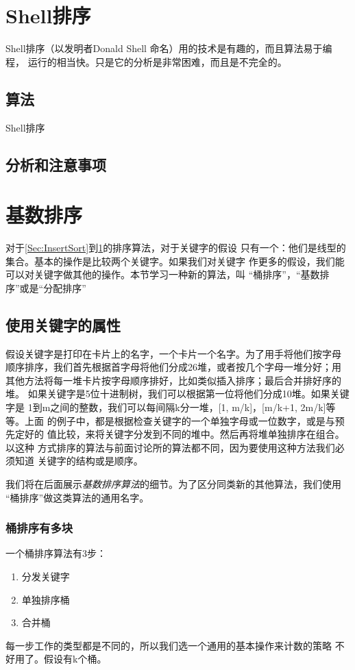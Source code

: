 \section{Shell排序}\label{Sec:ShellSort}
Shell排序（以发明者Donald Shell 命名）用的技术是有趣的，而且算法易于编程，
运行的相当快。只是它的分析是非常困难，而且是不完全的。
\subsection{算法}
Shell排序
\subsection{分析和注意事项}

\section{基数排序}\label{Sec:RadixSorting}
对于\ref{Sec:InsertSort}到\ref{Sec:ShellSort}的排序算法，对于关键字的假设
只有一个：他们是线型的集合。基本的操作是比较两个关键字。如果我们对关键字
作更多的假设，我们能可以对关键字做其他的操作。本节学习一种新的算法，叫
“桶排序”，“基数排序”或是“分配排序”
\subsection{使用关键字的属性}
假设关键字是打印在卡片上的名字，一个卡片一个名字。为了用手将他们按字母
顺序排序，我们首先根据首字母将他们分成26堆，或者按几个字母一堆分好；用
其他方法将每一堆卡片按字母顺序排好，比如类似插入排序；最后合并排好序的堆。
如果关键字是5位十进制树，我们可以根据第一位将他们分成10堆。如果关键字是
1到m之间的整数，我们可以每间隔k分一堆，[1, m/k]，[m/k+1, 2m/k]等等。上面
的例子中，都是根据检查关键字的一个单独字母或一位数字，或是与预先定好的
值比较，来将关键字分发到不同的堆中。然后再将堆单独排序在组合。以这种
方式排序的算法与前面讨论所的算法都不同，因为要使用这种方法我们必须知道
关键字的结构或是顺序。

我们将在后面展示\emph{基数排序算法}的细节。为了区分同类新的其他算法，我们使用
“桶排序”做这类算法的通用名字。

\subsubsection{桶排序有多块}
一个桶排序算法有3步：
\begin{enumerate}
\item 分发关键字
\item 单独排序桶
\item 合并桶
\end{enumerate}
每一步工作的类型都是不同的，所以我们选一个通用的基本操作来计数的策略
不好用了。假设有k个桶。

